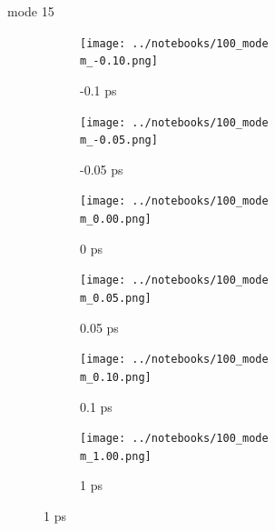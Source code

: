 \documentclass{beamer}
\begin{document}
\renewcommand\m{15}
\begin{frame}{mode \m}
	\begin{figure}
		\centering
		\begin{subfigure}[b]{\w\textwidth}
			\centering
			\texttt{[image: ../notebooks/100\_mode\\m\_-0.10.png]}
			\caption{-0.1 ps}
		\end{subfigure}
		\begin{subfigure}[b]{\w\textwidth}
			\centering
			\texttt{[image: ../notebooks/100\_mode\\m\_-0.05.png]}
			\caption{-0.05 ps}
		\end{subfigure}
		\begin{subfigure}[b]{\w\textwidth}
			\centering
			\texttt{[image: ../notebooks/100\_mode\\m\_0.00.png]}
			\caption{0 ps}
		\end{subfigure}
		\begin{subfigure}[b]{\w\textwidth}
			\centering
			\texttt{[image: ../notebooks/100\_mode\\m\_0.05.png]}
			\caption{0.05 ps}
		\end{subfigure}
		\begin{subfigure}[b]{\w\textwidth}
			\centering
			\texttt{[image: ../notebooks/100\_mode\\m\_0.10.png]}
			\caption{0.1 ps}
		\end{subfigure}
		\begin{subfigure}[b]{\w\textwidth}
			\centering
			\texttt{[image: ../notebooks/100\_mode\\m\_1.00.png]}
			\caption{1 ps}
		\end{subfigure}
	\end{figure}
\end{frame}
\end{document}
